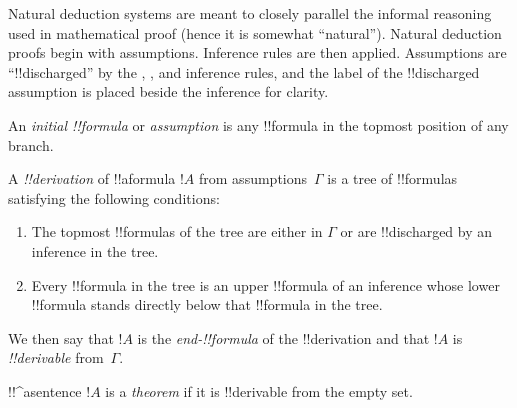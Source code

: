 \documentclass[../../../include/open-logic-section]{subfiles}
\begin{document}
\begin{explain}
Natural deduction systems are meant to closely parallel the informal
reasoning used in mathematical proof (hence it is somewhat
``natural''). Natural deduction proofs begin with assumptions.
Inference rules are then applied. Assumptions are ``!!{discharged}''
by the \Intro{\lnot}, \Intro{\lif}, \Elim{\lor} and \Elim{\lexists}
inference rules, and the label of the !!{discharged} assumption is
placed beside the inference for clarity.
\end{explain}

\begin{defn}
An \emph{initial !!{formula}} or \emph{assumption} is any !!{formula}
in the topmost position of any branch.
\end{defn}

\begin{defn}[!!^{derivation}]
A \emph{!!{derivation}} of !!a{formula} $!A$ from assumptions~$\Gamma$
is a tree of !!{formula}s satisfying the following conditions:
\begin{enumerate}
\item The topmost !!{formula}s of the tree are either in $\Gamma$ or
  are !!{discharged} by an inference in the tree.
\item Every !!{formula} in the tree is an upper !!{formula} of an
  inference whose lower !!{formula} stands directly below that !!{formula} in
  the tree.
\end{enumerate}
We then say that $!A$ is the \emph{end-!!{formula}} of the
!!{derivation} and that $!A$ is \emph{!!{derivable}} from~$\Gamma$.
\end{defn}

\begin{defn}[Theorem]
!!^a{sentence} $!A$ is a \emph{theorem} if it is !!{derivable}
from the empty set.
\end{defn}
\end{document}

